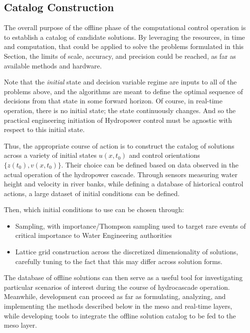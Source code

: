 \documentclass{article}
\newcommand{\1}{\mathds{1}}          %
\theoremstyle{definition}
\begin{document}
\begin{sloppypar}


\subsection{Catalog Construction}
The overall purpose of the offline phase of the computational control operation is to establish a catalog of candidate solutions. By leveraging the resources, in time and computation, that could be applied to solve the problems formulated in this Section, the limits of scale, accuracy, and precision could be reached, as far as available methods and hardware. 

Note that the \emph{initial} state and decision variable regime are inputs to all of the problems above, and the algorithms are meant to define the optimal sequence of decisions from that state in some forward horizon. Of course, in real-time operation, there is no initial state; the state continuously changes. And so the practical engineering initiation of Hydropower control must be agnostic with respect to this initial state. 

Thus, the appropriate course of action is to construct the catalog of solutions across a variety of initial states $u(x,t_0)$ and control orientations $\{z(t_0),v(x,t_0)\}$. Their choice can be defined based on data observed in the actual operation of the hydropower cascade. Through sensors measuring water height and velocity in river banks, while defining a database of historical control actions, a large dataset of initial conditions can be defined. 

Then, which initial conditions to use can be chosen through:
\begin{itemize}
    \item Sampling, with importance/Thompson sampling used to target rare events of critical importance to Water Engineering authorities
    \item Lattice grid construction across the discretized dimensionality of solutions, carefully tuning to the fact that this may differ across solution forms. 
\end{itemize}

The database of offline solutions can then serve as a useful tool for investigating particular scenarios of interest during the course of hydrocascade operation. Meanwhile, development can proceed as far as formulating, analyzing, and implementing the methods described below in the meso and real-time layers, while developing tools to integrate the offline solution catalog to be fed to the meso layer. 


\end{sloppypar}
\end{document}

